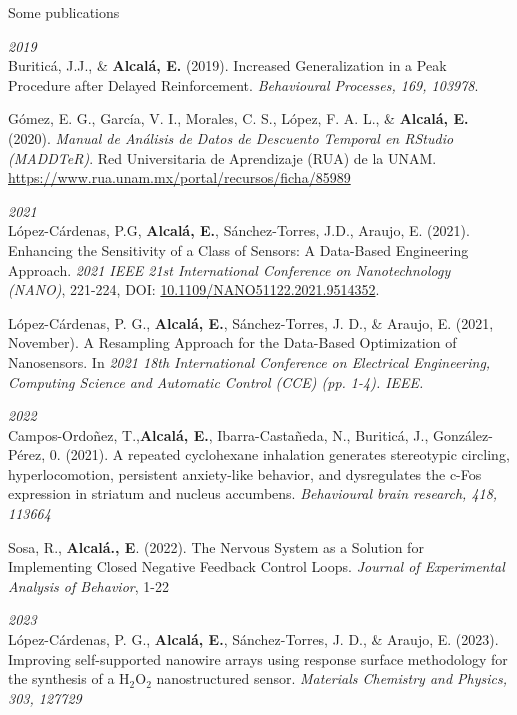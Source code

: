 \documentclass{resume} %
\begin{document}
\begin{rSection}{Some publications}

{\em 2019} \\
Buriticá, J.J., \& \textbf{Alcalá, E.} (2019). Increased Generalization in a Peak Procedure after Delayed Reinforcement. \textit{Behavioural Processes, 169, 103978}.

Gómez, E. G., García, V. I., Morales, C. S., López, F. A. L., \& \textbf{Alcalá, E.} (2020). \textit{Manual de Análisis de Datos de Descuento Temporal en RStudio (MADDTeR)}. Red Universitaria de Aprendizaje (RUA) de la UNAM. \url{https://www.rua.unam.mx/portal/recursos/ficha/85989}

{\em 2021} \\
López-Cárdenas, P.G, \textbf{Alcalá, E.}, Sánchez-Torres, J.D., Araujo, E. (2021). Enhancing the Sensitivity of a Class of Sensors: A Data-Based Engineering Approach. \textit{2021 IEEE 21st International Conference on Nanotechnology (NANO)}, 221-224, DOI: \url{10.1109/NANO51122.2021.9514352}. 

López-Cárdenas, P. G.,\textbf{ Alcalá, E.}, Sánchez-Torres, J. D., \& Araujo, E. (2021, November). A Resampling Approach for the Data-Based Optimization of Nanosensors. In \textit{2021 18th International Conference on Electrical Engineering, Computing Science and Automatic Control (CCE) (pp. 1-4). IEEE.}

{\em 2022}\\ 
Campos-Ordoñez, T.,\textbf{Alcalá, E.}, Ibarra-Castañeda, N., Buriticá, J., González-Pérez, 0. (2021). A repeated cyclohexane inhalation generates stereotypic circling, hyperlocomotion, persistent anxiety-like behavior, and dysregulates the c-Fos expression in striatum and nucleus accumbens. \textit{Behavioural brain research, 418, 113664}

Sosa, R., \textbf{Alcalá., E}. (2022). The Nervous System as a Solution for Implementing Closed Negative Feedback Control Loops. \textit{Journal of Experimental Analysis of Behavior}, 1-22

{\em 2023}\\
López-Cárdenas, P. G.,\textbf{ Alcalá, E.}, Sánchez-Torres, J. D., \& Araujo, E. (2023). Improving self-supported nanowire arrays using response surface methodology for the synthesis of a H$_2$O$_2$ nanostructured sensor. \textit{Materials Chemistry and Physics, 303, 127729}

\end{rSection}
\end{document}
